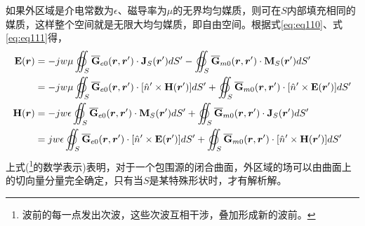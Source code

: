 \documentclass{article}
\numberwithin{equation}{section}
\renewcommand{\vec}[1]{\boldsymbol{#1}}
\begin{document}
\par
如果外区域是介电常数为$\epsilon$、磁导率为$\mu$的无界均匀媒质，则可在$S$内部填充相同的媒质，这样整个空间就是无限大均匀媒质，即自由空间。根据式\ref{eq:eq110}、式\ref{eq:eq111}得，
\begin{align}
    \label{eq:eq218}
    \mathbf{E}(\vec{r})&=-jw\mu\varoiint_S\overline{\mathbf{G}}_{e0}(\vec{r},\vec{r}')\cdot \mathbf{J}_S(\vec{r}')dS'-\varoiint_S\overline{\mathbf{G}}_{m0}(\vec{r},\vec{r}')\cdot \mathbf{M}_S(\vec{r}')dS' \nonumber \\
                       &=-jw\mu\varoiint_S\overline{\mathbf{G}}_{e0}(\vec{r},\vec{r}')\cdot [\hat{n}'\times\mathbf{H}(\vec{r}')]dS'+\varoiint_S\overline{\mathbf{G}}_{m0}(\vec{r},\vec{r}')\cdot [\hat{n}'\times\mathbf{E}(\vec{r}')]dS' \\
    \label{eq:eq219}
    \mathbf{H}(\vec{r})&=-jw\epsilon\varoiint_S\overline{\mathbf{G}}_{e0}(\vec{r},\vec{r}')\cdot \mathbf{M}_S(\vec{r}')dS'+\varoiint_S\overline{\mathbf{G}}_{m0}(\vec{r},\vec{r}')\cdot \mathbf{J}_S(\vec{r}')dS' \nonumber \\
                       &=jw\epsilon\varoiint_S\overline{\mathbf{G}}_{e0}(\vec{r},\vec{r}')\cdot [\hat{n}'\times\mathbf{E}(\vec{r}')]dS'+\varoiint_S\overline{\mathbf{G}}_{m0}(\vec{r},\vec{r}')\cdot [\hat{n}'\times\mathbf{H}(\vec{r}')]dS'
\end{align}
上式(\textbf{\color{blue}{惠更斯原理}}\footnote{波前的每一点发出次波，这些次波互相干涉，叠加形成新的波前。}的数学表示)表明，对于一个包围源的闭合曲面，外区域的场可以由曲面上的切向量分量完全确定，只有当$S$是某特殊形状时，才有解析解。
\end{document}
